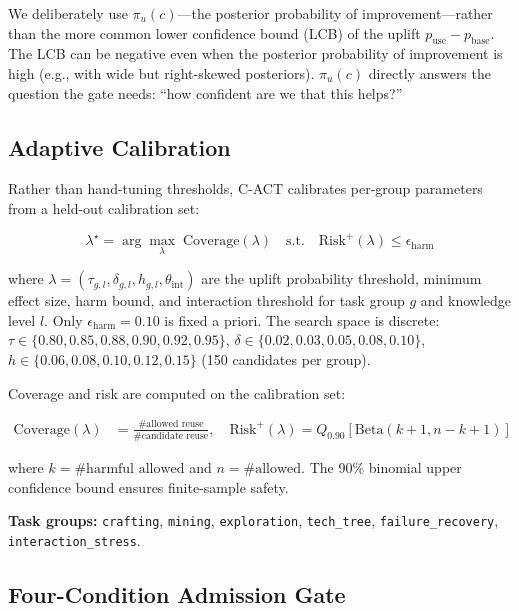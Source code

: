 \documentclass[letterpaper]{article}
\begin{document}
We deliberately use $\pi_u(c)$---the posterior probability of improvement---rather than the more common lower confidence bound (LCB) of the uplift $p_{\text{use}} - p_{\text{base}}$. The LCB can be negative even when the posterior probability of improvement is high (e.g., with wide but right-skewed posteriors). $\pi_u(c)$ directly answers the question the gate needs: ``how confident are we that this helps?''

\subsection{Adaptive Calibration}

Rather than hand-tuning thresholds, \textsc{C-ACT} calibrates per-group parameters from a held-out calibration set:

\begin{equation}
\lambda^\star = \arg\max_{\lambda} \; \text{Coverage}(\lambda) \quad \text{s.t.} \quad \text{Risk}^+(\lambda) \leq \epsilon_{\text{harm}}
\end{equation}

where $\lambda = (\tau_{g,l}, \delta_{g,l}, h_{g,l}, \theta_{\text{int}})$ are the uplift probability threshold, minimum effect size, harm bound, and interaction threshold for task group $g$ and knowledge level $l$. Only $\epsilon_{\text{harm}} = 0.10$ is fixed a priori. The search space is discrete: $\tau \in \{0.80, 0.85, 0.88, 0.90, 0.92, 0.95\}$, $\delta \in \{0.02, 0.03, 0.05, 0.08, 0.10\}$, $h \in \{0.06, 0.08, 0.10, 0.12, 0.15\}$ (150 candidates per group).

Coverage and risk are computed on the calibration set:

\begin{align}
\text{Coverage}(\lambda) &= \frac{\#\text{allowed reuse}}{\#\text{candidate reuse}}, \quad
\text{Risk}^+(\lambda) = Q_{0.90}[\text{Beta}(k+1, n-k+1)]
\end{align}

where $k = \#\text{harmful allowed}$ and $n = \#\text{allowed}$. The 90\% binomial upper confidence bound ensures finite-sample safety.

\textbf{Task groups:} \texttt{crafting}, \texttt{mining}, \texttt{exploration}, \texttt{tech\_tree}, \texttt{failure\_recovery}, \texttt{interaction\_stress}.

\subsection{Four-Condition Admission Gate}
\end{document}
